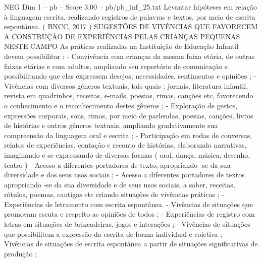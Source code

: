 \begin{textsample}{NEG Dim 1 – pb – Score 3.00 – pb/pb\_inf\_25.txt}
Levantar hipóteses em relação à linguagem escrita, realizando registros de palavras e textos, por meio de escrita espontânea. ( BNCC, 2017 ) SUGESTÕES DE VIVÊNCIAS QUE FAVORECEM A CONSTRUÇÃO DE EXPERIÊNCIAS PELAS CRIANÇAS PEQUENAS NESTE CAMPO As práticas realizadas na Instituição de Educação Infantil devem possibilitar : - Convivência com crianças da mesma faixa etária, de outras faixas etárias e com adultos, ampliando seu repertório de comunicação e possibilitando que elas expressem desejos, necessidades, sentimentos e opiniões ; - Vivências com diversos gêneros textuais, tais quais : jornais, literatura infantil, revista em quadrinhos, receitas, e-mails, poesias, rimas, canções etc, favorecendo o conhecimento e o reconhecimento destes gêneros ; - Exploração de gestos, expressões corporais, sons, rimas, por meio de parlendas, poesias, canções, livros de histórias e outros gêneros textuais, ampliando gradativamente sua compreensão da linguagem oral e escrita ; - Participação em rodas de conversas, relatos de experiências, contação e reconto de histórias, elaborando narrativas, imaginando e se expressando de diversas formas ( oral, dança, música, desenho, teatro ) - Acesso a diferentes portadores de texto, apropriando -se da sua diversidade e dos seus usos sociais ; - Acesso a diferentes portadores de textos apropriando -se da sua diversidade e de seus usos sociais, a saber, receitas, rótulos, poemas, cantigas etc criando situações de vivências práticas ; - Experiências de letramento com escrita espontânea. - Vivências de situações que promovam escuta e respeito as opiniões de todos ; - Experiências de registro com letras em situações de brincadeiras, jogos e interações ; - Vivências de situações que possibilitem a expressão da escrita de forma individual e coletiva ; - Vivências de situações de escrita espontânea a partir de situações significativas de produção ;

\end{textsample}
